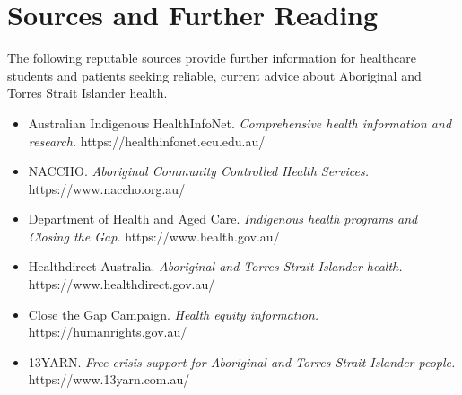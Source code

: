 \section*{Sources and Further Reading}
The following reputable sources provide further information for healthcare students and patients seeking reliable, current advice about Aboriginal and Torres Strait Islander health.
\begin{itemize}
    \item Australian Indigenous HealthInfoNet. \textit{Comprehensive health information and research.} https://healthinfonet.ecu.edu.au/
    \item NACCHO. \textit{Aboriginal Community Controlled Health Services.} https://www.naccho.org.au/
    \item Department of Health and Aged Care. \textit{Indigenous health programs and Closing the Gap.} https://www.health.gov.au/
    \item Healthdirect Australia. \textit{Aboriginal and Torres Strait Islander health.} https://www.healthdirect.gov.au/
    \item Close the Gap Campaign. \textit{Health equity information.} https://humanrights.gov.au/
    \item 13YARN. \textit{Free crisis support for Aboriginal and Torres Strait Islander people.} https://www.13yarn.com.au/
\end{itemize}
